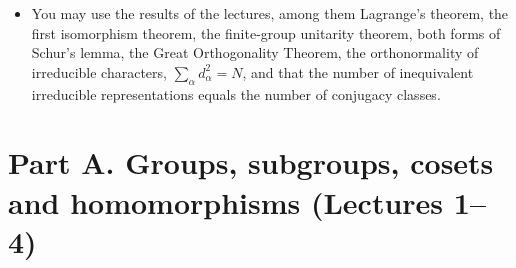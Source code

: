 \documentclass[11pt,a4paper]{article}
\DeclareMathOperator{\sgn}{sgn}
\begin{document}
\begin{itemize}
  \[
    D_E(r) = R = \begin{pmatrix} -\tfrac12 & -\tfrac{\sqrt3}{2} \\[2pt] \tfrac{\sqrt3}{2} & -\tfrac12 \end{pmatrix}, \qquad
    D_E(s) = F = \begin{pmatrix} 1 & 0 \\ 0 & -1 \end{pmatrix},
  \]
  using $\cos 120^\circ = -\tfrac12$ and $\sin 120^\circ = \tfrac{\sqrt3}{2}$. Whenever a problem uses a specific angle, the sines and cosines it needs are given.
  The classes of $S_3$ are $\{e\}$, the two 3-cycles $\{r, r^2\}$ (rotations) and the three transpositions $\{s, rs, r^2 s\}$ (reflections). Its irreducible representations are the trivial representation $1$, the sign representation $\sgn$ and $E$, with the characters
  \[
    \begin{array}{c|ccc}
      & \{e\} & \{r, r^2\} & \{s, rs, r^2 s\} \\ \hline
      1 & 1 & 1 & 1 \\
      \sgn & 1 & 1 & -1 \\
      E & 2 & -1 & 0
    \end{array}
  \]
  \item You may use the results of the lectures, among them Lagrange's theorem, the first isomorphism theorem, the finite-group unitarity theorem, both forms of Schur's lemma, the Great Orthogonality Theorem, the orthonormality of irreducible characters, $\sum_\alpha d_\alpha^2 = N$, and that the number of inequivalent irreducible representations equals the number of conjugacy classes.
\end{itemize}

\section*{\large Part A. Groups, subgroups, cosets and homomorphisms (Lectures 1--4)}
\end{document}
